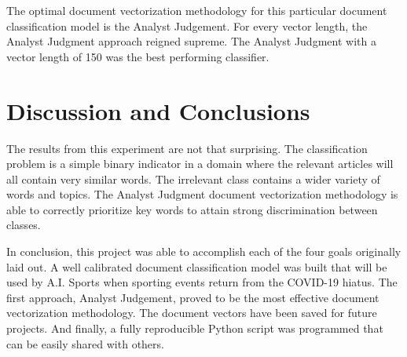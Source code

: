 \documentclass[5p,authoryear]{elsarticle}
\begin{document}
The optimal document vectorization methodology for this particular document classification model is the Analyst Judgement. 
For every vector length, the Analyst Judgment approach reigned supreme. 
The Analyst Judgment with a vector length of 150 was the best performing classifier. 


\section{Discussion and Conclusions}

The results from this experiment are not that surprising. 
The classification problem is a simple binary indicator in a domain where the relevant articles will all contain very similar words. 
The irrelevant class contains a wider variety of words and topics. 
The Analyst Judgment document vectorization methodology is able to correctly prioritize key words to attain strong discrimination between classes.

In conclusion, this project was able to accomplish each of the four goals originally laid out. 
A well calibrated document classification model was built that will be used by A.I. Sports when sporting events return from the COVID-19 hiatus. 
The first approach, Analyst Judgement, proved to be the most effective document vectorization methodology.
The document vectors have been saved for future projects.
And finally, a fully reproducible Python script was programmed that can be easily shared with others. 

\clearpage




\end{document}
